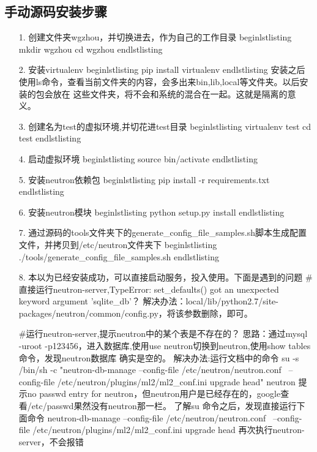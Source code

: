 \documentclass[a4paper,left=1.5cm,right=1.5cm,11pt]{article}
\begin{document}
\subsection{手动源码安装步骤}
    \begin{itemize}
	    \item[1.]创建文件夹wgzhou，并切换进去，作为自己的工作目录
			begin{lstlisting}
				mkdir wgzhou
				cd wgzhou
			end{lstlisting}
		\item[2.]安装virtualenv
			begin{lstlisting}
				pip install virtualenv
			end{lstlisting}
			安装之后使用ls命令，查看当前文件夹的内容，会多出来bin,lib,local等文件夹。以后安装的包会放在
			这些文件夹，将不会和系统的混合在一起。这就是隔离的意义。
		\item[3.]创建名为test的虚拟环境,并切花进test目录
			begin{lstlisting}
				virtualenv test
				cd test
			end{lstlisting}
		\item[4.]启动虚拟环境
			begin{lstlisting}
				source bin/activate
			end{lstlisting}
        \item[5.]安装neutron依赖包
			begin{lstlisting}
				pip install -r requirements.txt
			end{lstlisting}
		\item[6.]安装neutron模块
			begin{lstlisting}
				python setup.py install
			end{lstlisting}
		\item[7.]通过源码的tools文件夹下的generate_config_file_samples.sh脚本生成配置文件，并拷贝到/etc/neutron文件夹下
			begin{lstlisting}
				./tools/generate_config_file_samples.sh
			end{lstlisting}	
		\item[8.]本以为已经安装成功，可以直接启动服务，投入使用。下面是遇到的问题
			#直接运行neutron-server,TypeError: set_defaults() got an unexpected keyword argument 'sqlite_db'？
			解决办法：local/lib/python2.7/site-packages/neutron/common/config.py，将该参数删除，即可。

			#运行neutron-server,提示neutron中的某个表是不存在的？
			思路：通过mysql -uroot -p123456，进入数据库,使用use neutron切换到neutron,使用show tables命令，发现neutron数据库
			确实是空的。
			解决办法:运行文档中的命令
			su -s /bin/sh -c "neutron-db-manage --config-file /etc/neutron/neutron.conf \
			--config-file /etc/neutron/plugins/ml2/ml2_conf.ini upgrade head" neutron
			提示no passwd entry for neutron，但neutron用户是已经存在的，google查看/etc/passwd果然没有neutron那一栏。
			了解su 命令之后，发现直接运行下面命令
			neutron-db-manage --config-file /etc/neutron/neutron.conf \
			--config-file /etc/neutron/plugins/ml2/ml2_conf.ini upgrade head
			再次执行neutron-server，不会报错


\end{itemize}
\end{document}
